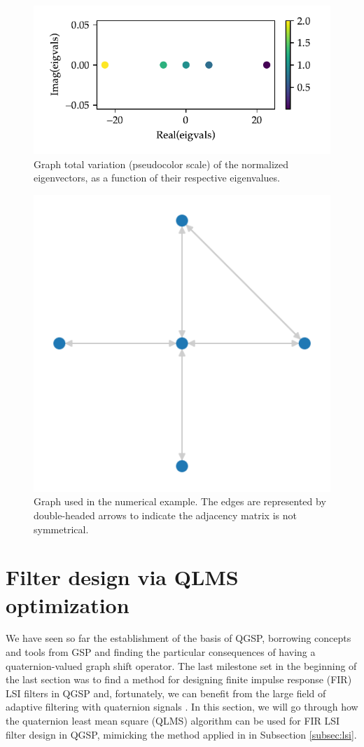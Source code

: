 \begin{figure}
    \centering
    \includegraphics[width=0.55\linewidth]{Figures/simple_example_tv.pdf}
    \caption{Graph total variation (pseudocolor scale) of the normalized eigenvectors, as a function of their respective eigenvalues.}
    \label{fig:simple_example_tv}
\end{figure}

\begin{figure}
    \centering
    \includegraphics[width=0.3\linewidth]{Figures/degenerate_qgft_graph.pdf}
    \caption{Graph used in the numerical example. The edges are represented by double-headed arrows to indicate the adjacency matrix is not symmetrical.}
    \label{fig:degenerate_qgft_graph}
\end{figure}

\section{Filter design via QLMS optimization}
We have seen so far the establishment of the basis of QGSP, borrowing concepts and tools from GSP and finding the particular consequences of having a quaternion-valued graph shift operator. The last milestone set in the beginning of the last section was to find a method for designing finite impulse response (FIR) LSI filters in QGSP and, fortunately, we can benefit from the large field of adaptive filtering with quaternion signals \parencite{ortolani2017frequency}. In this section, we will go through how the quaternion least mean square (QLMS) algorithm can be used for FIR LSI filter design in QGSP, mimicking the method applied in in Subsection \ref{subsec:lsi}.


